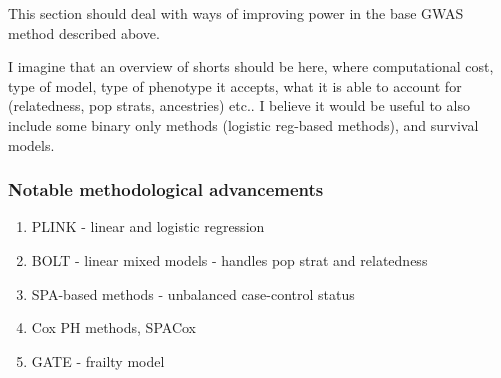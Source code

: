 This section should deal with ways of improving power in the base GWAS method described above.

I imagine that an overview of shorts should be here, where computational cost, type of model, type of phenotype it accepts, what it is able to account for (relatedness, pop strats, ancestries) etc.. I believe it would be useful to also include some binary only methods (logistic reg-based methods), and survival models.


\subsubsection{Notable methodological advancements}

\begin{enumerate}
	\item PLINK - linear and logistic regression
	\item BOLT - linear mixed models - handles pop strat and relatedness
	\item SPA-based methods - unbalanced case-control status
	\item Cox PH methods, SPACox
	\item GATE - frailty model
\end{enumerate}


